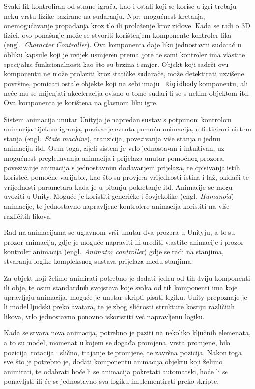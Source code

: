 Svaki lik kontroliran od strane igrača, kao i ostali koji se korise u igri trebaju neku vrstu fizike bazirane na sudaranju. Npr.~mogućnost kretanja, onemogućavanje propadanja kroz tlo ili prolaženje kroz zidove. Kada se radi o 3D fizici, ovo ponašanje može se stvoriti korištenjem komponente kontroler lika (engl.~\textit{Character Controller}). Ova komponenta daje liku jednostavni sudarač u obliku kapsule koji je uvijek usmjeren prema gore te sami kontroler ima vlastite specijalne funkcionalnosti kao što su brzina i smjer. Objekt koji sadrži ovu komponentu ne može prolaziti kroz statičke sudarače, može detektirati uzvišene površine, pomicati ostale objekte koji na sebi imaju ~\texttt{Rigidbody} komponentu, ali neće mu se mijenjati akceleracija ovisno o tome sudari li se s nekim objektom itd. Ova komponenta je korištena na glavnom liku igre.

Sistem animacija unutar Unityja je napredan sustav s potpunom kontrolom animacija tijekom igranja, pozivanje eventa pomoću animacija, sofisticirani sistem stanja (engl.~\textit{State machine}), tranzicija, povezivanja više stanja u jednu animaciju itd. Osim toga, cijeli sistem je vrlo jednostavan i intuitivan, uz mogućnost pregledavanja animacija i prijelaza unutar pomoćnog prozora, povezivanje animacija s jednostavnim dodavanjem prijelaza, te opisivanja istih koristeći pomoćne varijable, kao što su provjera vrijednosti istina i laž, okidači te vrijednosti parametara kada je u pitanju pokretanje itd. Animacije se mogu uvoziti u Unity. Moguće je koristiti generičke i čovjekolike (engl.~\textit{Humanoid}) animacije, te jednostavno napravljene kontrolere animacija koristiti na više različitih likova. 

Rad na animacijama se uglavnom vrši unutar dva prozora u Unityju, a to su prozor animacija, gdje je moguće napraviti ili urediti vlastite animacije i prozor kontroler animacija (engl.~\textit{Animator controller}) gdje se radi na stanjima, stvaranju logike kompleksnog sustava prijelaza među stanjima.

Za objekt koji želimo animirati potrebno je dodati jednu od tih dviju komponenti ili obje, te osim standardnih svojstava koje svaka od tih komponenti ima koje upravljaju animacija, moguće je unutar skripti pisati logiku. Unity prepoznaje je li model ljudski preko avatara, te je zbog sličnosti strukture kostiju različitih likova, vrlo jednostavno ponovno iskoristiti već napravljenu logiku. 

Kada se stvara nova animacija, potrebno je paziti na nekoliko ključnih elemenata, a to su model, momenat u kojem se događa promjena, vrsta promjene, bilo pozicija, rotacija i slično, trajanje te promjene, te završna pozicija. Nakon toga sve što je potrebno je, dodati komponentu animacija objektu koji želimo animirati, te odabrati hoće li se animacija pokretati automatski, hoće li se ponavljati ili će se jednostavno sva logiku implementirati preko skripte.

